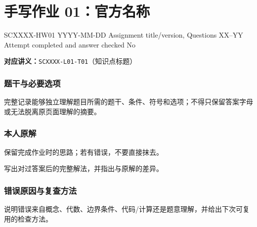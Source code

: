 
\section{手写作业 01：官方名称}\label{homework:SCXXXX-HW01}

\exercisemeta
  {SCXXXX-HW01}
  {YYYY-MM-DD}
  {Assignment title/version, Questions XX--YY}
  {Attempt completed and answer checked}
  {No}


\textbf{对应讲义：}\texttt{SCXXXX-L01-T01}（知识点标题）

\subsubsection*{题干与必要选项}

完整记录能够独立理解题目所需的题干、条件、符号和选项；不得只保留答案字母或无法脱离原页面理解的摘要。

\subsubsection*{本人原解}

保留完成作业时的思路；若有错误，不要直接抹去。

\begin{checkedsolution}
写出对过答案后的完整解法，并指出与原解的差异。
\end{checkedsolution}

\subsubsection*{错误原因与复查方法}

说明错误来自概念、代数、边界条件、代码/计算还是题意理解，并给出下次可复用的检查方法。
